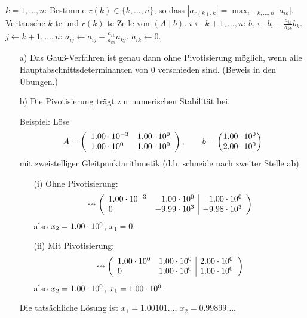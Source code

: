 \begin{Algorithmus}
\quad
\begin{codebox}
\li \For $k = 1, \ldots, n$:
\Do
  \li Bestimme $r(k) \in \{k, \ldots, n\}$, so dass
      $|a_{r(k),k}| = \max_{i=k,\ldots,n} |a_{ik}|.$
  \li Vertausche $k$-te und $r(k)$-te Zeile von $(A \mid b)$.
  \li \For $i \gets k + 1, \ldots, n$:
  \Do
    \li $b_i \gets b_i - \frac{a_{ik}}{a_{kk}} b_k$.
    \li \For $j \gets k+1, \ldots, n$:
    \Do
      \li $a_{ij} \gets a_{ij} - \frac{a_{ik}}{a_{kk}} a_{kj}$.
    \End
    \li $a_{ik} \gets 0$.
  \End
\End
\end{codebox}
\end{Algorithmus}

\begin{Bemerkungen}
\begin{itemize}
  \item[a)] Das Gauß-Verfahren ist genau dann ohne Pivotisierung möglich,
    wenn alle Hauptabschnittsdeterminanten von 0 verschieden sind. (Beweis in den Übungen.)

  \item[b)] Die Pivotisierung trägt zur numerischen Stabilität bei.

  Beispiel: Löse \[
    A = \left( \begin{array}{ll}
      1.00\cdot 10^{-3} & 1.00\cdot 10^{0} \\
      1.00\cdot 10^{0} &  1.00\cdot 10^{0}
    \end{array} \right),
    \qquad
    b = \begin{pmatrix}
      1.00\cdot 10^{0} \\
      2.00\cdot 10^{0}
    \end{pmatrix}
  \]
  mit zweistelliger Gleitpunktarithmetik (d.h. schneide nach zweiter Stelle ab).

  \begin{itemize}
    \item[(i)] Ohne Pivotisierung: \[
        \rightsquigarrow \left( \begin{array}{lr|r}
          1.00\cdot 10^{-3} & 1.00\cdot 10^{0} & 1.00\cdot 10^{0} \\
          0         & -9.99\cdot 10^{3} & -9.98\cdot 10^{3}
        \end{array} \right)
      \] also $x_2 = 1.00\cdot 10^{0}$, $x_1 = 0$.

    \item[(ii)] Mit Pivotisierung: \[
        \rightsquigarrow \left( \begin{array}{ll|l}
          1.00\cdot 10^{0} & 1.00\cdot 10^{0} & 2.00\cdot 10^{0} \\
          0         & 1.00\cdot 10^{0} & 1.00\cdot 10^{0}
        \end{array} \right)
      \] also $x_2 = 1.00\cdot 10^{0}$, $x_1 = 1.00\cdot 10^{0}$.
  \end{itemize}
  Die tatsächliche Lösung ist $x_1 = 1.00101\ldots$, $x_2 = 0.99899\ldots$.
\end{itemize}
\end{Bemerkungen}

